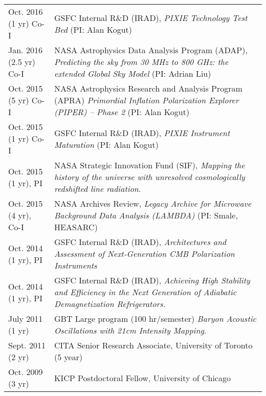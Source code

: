{\begin{tabular}{l p{12cm}}
Oct. 2016 (1 yr) Co-I & GSFC Internal R\&D (IRAD), {\em PIXIE Technology Test Bed} (PI: Alan Kogut) \\
Jan. 2016 (2.5 yr) Co-I & NASA Astrophysics Data Analysis Program (ADAP), {\em Predicting the sky from 30 MHz to 800 GHz: the extended Global Sky Model} (PI: Adrian Liu) \\
Oct. 2015 (5 yr) Co-I & NASA Astrophysics Research and Analysis Program (APRA) {\em Primordial Inflation Polarization Explorer (PIPER) -- Phase 2} (PI: Alan Kogut) \\
Oct. 2015 (1 yr) Co-I & GSFC Internal R\&D (IRAD), {\em PIXIE Instrument Maturation} (PI: Alan Kogut) \\
Oct. 2015 (1 yr), PI & NASA Strategic Innovation Fund (SIF), {\em Mapping the history of the universe with unresolved cosmologically redshifted line radiation}. \\
Oct. 2015 (4 yr), Co-I & NASA Archives Review, {\em Legacy Archive for Microwave Background Data Analysis (LAMBDA)} (PI: Smale, HEASARC)\\
Oct. 2014 (1 yr), PI & GSFC Internal R\&D (IRAD), {\em Architectures and Assessment of Next-Generation CMB Polarization Instruments} \\
Oct. 2014 (1 yr), PI & GSFC Internal R\&D (IRAD), {\em Achieving High Stability and Efficiency in the Next Generation of Adiabatic
 Demagnetization Refrigerators}. \\
July 2011 (1 yr) & GBT Large program (100 hr/semester) {\em Baryon Acoustic Oscillations with 21cm Intensity Mapping}. \\
Sept. 2011 (2 yr) & CITA Senior Research Associate, University of Toronto (5 year) \\
Oct. 2009 (3 yr) & KICP Postdoctoral Fellow, University of Chicago
\end{tabular} \\~\\~\\
}

